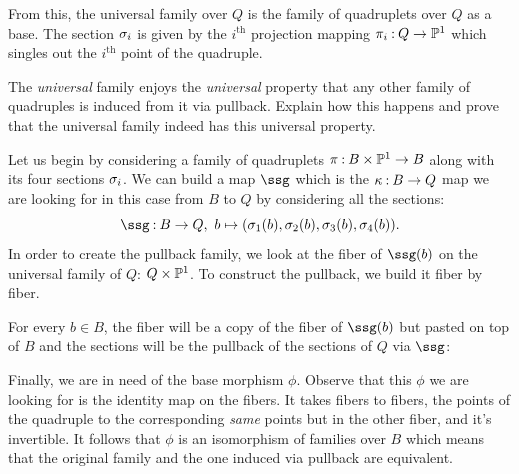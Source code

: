 \documentclass[12pt]{memoir}
\begin{document}
From this, the universal family over $Q$ is the family of quadruplets over $Q$ as a base. The section $\sigma_i$ is given by the $i^{\text{th}}$ projection mapping $\pi_i\mathbin{:} Q\to\mathbb{P}^1$ which singles out the $i^{\text{th}}$ point of the quadruple.

\begin{Ej}\label{ejer-universality-of-quadruplets-no-projective-equivalence}
    The \emph{universal} family enjoys the \emph{universal} property that any other family of quadruples is induced from it via pullback. Explain how this happens and prove that the universal family indeed has this universal property.
\end{Ej}

\begin{ptcb}
    Let us begin by considering a family of quadruplets $\pi\mathbin{:} B\times\mathbb{P}^1\to B$ along with its four sections $\sigma_i$. We can build a map $\ssg$ which is the $\kappa\mathbin{:} B\to Q$ map we are looking for in this case from $B$ to $Q$ by considering all the sections:
    $$\ssg\:B\to Q,\ b\mapsto(\sg_1(b),\sg_2(b),\sg_3(b),\sg_4(b)).$$
    In order to create the pullback family, we look at the fiber of $\ssg(b)$ on the universal family of $Q$: $Q\times\mathbb{P}^1$. To construct the pullback, we build it fiber by fiber.\par 
    For every $b\in B$, the fiber will be a copy of the fiber of $\ssg(b)$ but pasted on top of $B$ and the sections will be the pullback of the sections of $Q$ via $\ssg$:
    \begin{center}
    \end{center}
Finally, we are in need of the base morphism $\phi$. Observe that this $\phi$ we are looking for is the identity map on the fibers. It takes fibers to fibers, the points of the quadruple to the corresponding \emph{same} points but in the other fiber, and it's invertible. It follows that $\phi$ is an isomorphism of families over $B$ which means that the original family and the one induced via pullback are equivalent.\par

\end{ptcb}
\end{document}
